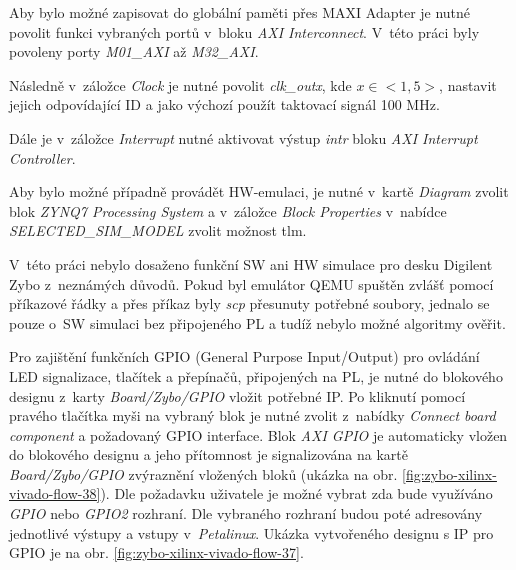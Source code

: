 \documentclass[a4paper, twoside, 11pt]{article}
\begin{document}
\begin{appendices}
		Aby bylo možné zapisovat do globální paměti přes MAXI Adapter je nutné povolit funkci vybraných portů v~bloku \textit{AXI Interconnect}. V~této práci byly povoleny porty \textit{M01\_AXI} až \textit{M32\_AXI}.\par
		Následně v~záložce \textit{Clock} je nutné povolit \textit{clk\_outx}, kde $x \in <1,5>$, nastavit jejich odpovídající ID a jako výchozí použít taktovací signál 100 MHz.\par
		Dále je v~záložce \textit{Interrupt} nutné aktivovat výstup \textit{intr} bloku \textit{AXI Interrupt Controller}.\par
		Aby bylo možné případně provádět HW-emulaci, je nutné v~kartě \textit{Diagram} zvolit blok \textit{ZYNQ7 Processing System} a v~záložce \textit{Block Properties} v~nabídce \textit{SELECTED\_SIM\_MODEL} zvolit možnost tlm. \cite{hackster-vitis-2021-1-embedded-platform-for-zybo-z7-20}\par
		V~této práci nebylo dosaženo funkční SW ani HW simulace pro desku Digilent Zybo z~neznámých důvodů. Pokud byl emulátor QEMU spuštěn zvlášť pomocí příkazové řádky a přes příkaz byly \textit{scp} přesunuty potřebné soubory, jednalo se pouze o~SW simulaci bez připojeného PL a tudíž nebylo možné algoritmy ověřit.\par
		Pro zajištění funkčních GPIO (General Purpose Input/Output) pro ovládání LED signalizace, tlačítek a přepínačů, připojených na PL, je nutné do blokového designu z~karty \textit{Board/Zybo/GPIO} vložit potřebné IP. Po kliknutí pomocí pravého tlačítka myši na vybraný blok je nutné zvolit z~nabídky \textit{Connect board component} a požadovaný GPIO interface. Blok \textit{AXI GPIO} je automaticky vložen do blokového designu a jeho přítomnost je signalizována na kartě \textit{Board/Zybo/GPIO} zvýraznění vložených bloků (ukázka na obr. \ref{fig:zybo-xilinx-vivado-flow-38}). Dle požadavku uživatele je možné vybrat zda bude využíváno \textit{GPIO} nebo \textit{GPIO2} rozhraní. Dle vybraného rozhraní budou poté adresovány jednotlivé výstupy a vstupy v~\textit{Petalinux}. Ukázka vytvořeného designu s IP pro GPIO je na obr. \ref{fig:zybo-xilinx-vivado-flow-37}.



\end{appendices}
\end{document}
